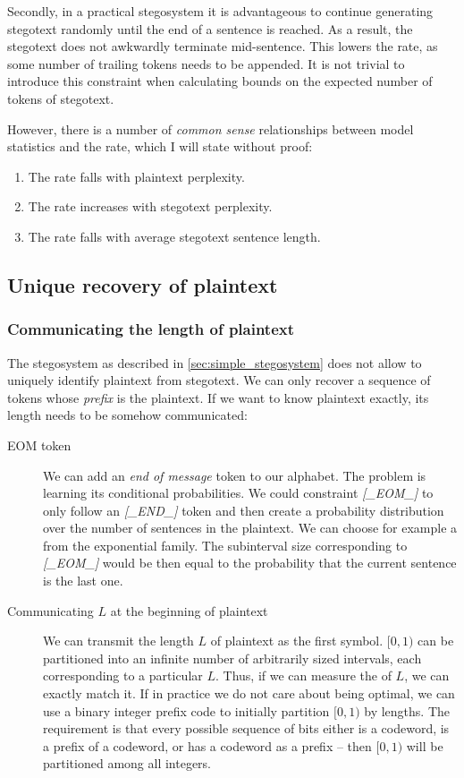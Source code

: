 \documentclass[draft]{IIBproject}
\makeatletter
\DeclareRobustCommand*{\AbbreviationWithDot}[1]{\@ifnextchar{.}{#1}{#1.\@\xspace}}
\DeclareRobustCommand*{\pmf}{\AbbreviationWithDot{p.m.f}}
\DeclareRobustCommand{\ngram}[1]{\emph{[#1]}}
\makeatother
\begin{document}
Secondly, in a practical stegosystem it is advantageous to continue generating stegotext randomly until the end of a sentence is reached. As a result, the stegotext does not awkwardly terminate mid-sentence. This lowers the rate, as some number of trailing tokens needs to be appended. It is not trivial to introduce this constraint when calculating bounds on the expected number of tokens of stegotext.

However, there is a number of \emph{common sense} relationships between model statistics and the rate, which I will state without proof:

\begin{enumerate}
\item The rate falls with plaintext perplexity.
\item The rate increases with stegotext perplexity.
\item The rate falls with average stegotext sentence length.
\end{enumerate}

\subsection{Unique recovery of plaintext}

\subsubsection{Communicating the length of plaintext}

The stegosystem as described in \cref{sec:simple_stegosystem} does not allow to uniquely identify plaintext from stegotext. We can only recover a sequence of tokens whose \emph{prefix} is the plaintext. If we want to know plaintext exactly, its length needs to be somehow communicated:

\begin{description}
	\item[EOM token] We can add an \emph{end of message} token to our alphabet. The problem is learning its conditional probabilities. We could constraint \ngram{\_EOM\_} to only follow an \ngram{\_END\_} token and then create a probability distribution over the number of sentences in the plaintext. We can choose for example a \pmf from the exponential family. The subinterval size corresponding to \ngram{\_EOM\_} would be then equal to the probability that the current sentence is the last one.
	\item[Communicating $L$ at the beginning of plaintext] We can transmit the length $L$ of plaintext as the first symbol. $[0,1)$ can be partitioned into an infinite number of arbitrarily sized intervals, each corresponding to a particular $L$. Thus, if we can measure the \pmf of $L$, we can exactly match it. If in practice we do not care about being optimal, we can use a binary integer prefix code to initially partition $[0,1)$ by lengths. The requirement is that every possible sequence of bits either is a codeword, is a prefix of a codeword, or has a codeword as a prefix -- then $[0,1)$ will be partitioned among all integers.
\end{description}
\end{document}
